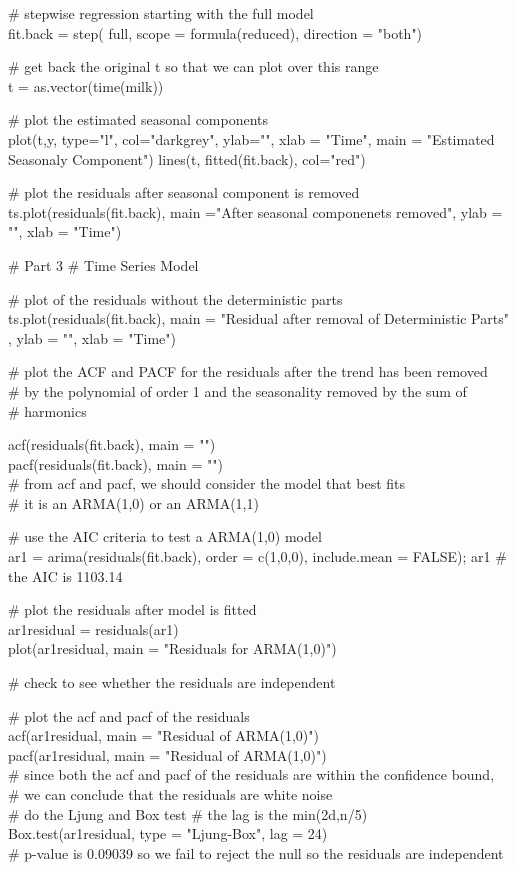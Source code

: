 \documentclass{article}
\begin{document}
\# stepwise regression starting with the full model \\
fit.back = step( full, scope = formula(reduced), direction = "both")

\# get back the original t so that we can plot over this range \\
t = as.vector(time(milk))

\# plot the estimated seasonal components \\
plot(t,y, type="l", col="darkgrey", ylab="", xlab = "Time", 
     main = "Estimated Seasonaly Component")
lines(t, fitted(fit.back), col="red") 


\# plot the residuals after seasonal component is removed \\
ts.plot(residuals(fit.back), main ="After seasonal componenets removed", ylab = "", xlab = "Time")

\# Part 3
\# Time Series Model
  
\# plot of the residuals without the deterministic parts \\
ts.plot(residuals(fit.back), main = "Residual after removal of Deterministic Parts"
          , ylab = "", xlab = "Time")  
  
\# plot the ACF and PACF for the residuals after the trend has been removed \\
\# by the polynomial of order 1 and the seasonality removed by the sum of \\
\# harmonics 
  
acf(residuals(fit.back), main = "") \\
pacf(residuals(fit.back), main = "") \\ 
\# from acf and pacf, we should consider the model that best fits \\
\# it is an ARMA(1,0) or an ARMA(1,1)

\# use the AIC criteria to test a ARMA(1,0) model \\
ar1 = arima(residuals(fit.back), order = c(1,0,0), include.mean = FALSE); ar1
\# the AIC is 1103.14

\# plot the residuals after model is fitted \\
ar1residual = residuals(ar1) \\
plot(ar1residual, main = "Residuals for ARMA(1,0)")

\# check to see whether the residuals are independent

\# plot the acf and pacf of the residuals \\
acf(ar1residual, main = "Residual of ARMA(1,0)") \\
pacf(ar1residual, main = "Residual of ARMA(1,0)") \\
\# since both the acf and pacf of the residuals are within the confidence bound, \\
\# we can conclude that the residuals are white noise \\
\# do the Ljung and Box test 
\# the lag is the min(2d,n/5) \\ 
Box.test(ar1residual, type = "Ljung-Box", lag = 24) \\
\# p-value is 0.09039 so we fail to reject the null so the residuals are independent \\
\end{document}
